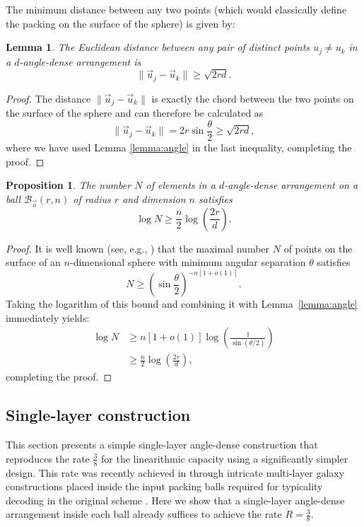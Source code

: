 \documentclass[10pt,conference]{IEEEtran}
\newtheorem{lemma}[theorem]{Lemma}
\newtheorem{proposition}[theorem]{Proposition}
\newcommand{\1}{\mathds{1}}
\newcommand{\cB}{\mathcal{B}}
\begin{document}
The minimum distance between any two points (which would classically define the packing on the surface of the sphere) is given by:
\begin{lemma}\label{lemma:distance}
The Euclidean distance between any pair of distinct points $u_j\neq u_k$ in a $d$-angle-dense arrangement is
\[
\|\vec{u}_j-\vec{u}_k\|\geq\sqrt{2rd}.
\]
\end{lemma}
\begin{proof}
The distance $\|\vec{u}_j-\vec{u}_k\|$ is exactly the chord between the two points on the surface of the sphere and can therefore be calculated as 
\begin{equation}\label{eq:chord}
\|\vec{u}_j-\vec{u}_k\|=2r\sin\frac{\theta}{2}\geq\sqrt{2rd},
\end{equation}
where we have used Lemma \ref{lemma:angle} in the last inequality, completing the proof.
\end{proof}

\begin{proposition}\label{prop:size_bound}
The number $N$ of elements in a $d$-angle-dense arrangement on a ball $\cB_{\vec o}(r,n)$ of radius $r$ and dimension $n$ satisfies
\[
\log N \geq \frac{n}{2}\log\left(\frac{2r}{d}\right).
\]
\end{proposition}
\begin{proof}
It is well known (see, e.g., \cite{packing_book}) that the maximal number $N$ of points on the surface of an $n$-dimensional sphere with minimum angular separation $\theta$ satisfies
\begin{equation}
N \geq \left(\sin\frac{\theta}{2}\right)^{-n[1+o(1)]}.
\end{equation}
Taking the logarithm of this bound and combining it with Lemma~\ref{lemma:angle} immediately yields:
\begin{equation}
\begin{split}
\log N &\geq n[1+o(1)]\log\left(\frac{1}{\sin(\theta/2)}\right)\\
&\geq \frac{n}{2}\log\left(\frac{2r}{d}\right),
\end{split}
\end{equation}
completing the proof.
\end{proof}

\subsection{Single-layer construction}\label{ssec:single-layer}
This section presents a simple single-layer angle-dense construction that reproduces the rate $\frac{3}{8}$ for the linearithmic capacity using a significantly simpler design. This rate was recently achieved in \cite{galaxy-codes} through intricate multi-layer galaxy constructions placed inside the input packing balls required for typicality decoding in the original scheme \cite{DI-fading,RRGauss-arXiv}. Here we show that a single-layer angle-dense arrangement inside each ball already suffices to achieve the rate $\dot R=\frac{3}{8}$.
\end{document}

